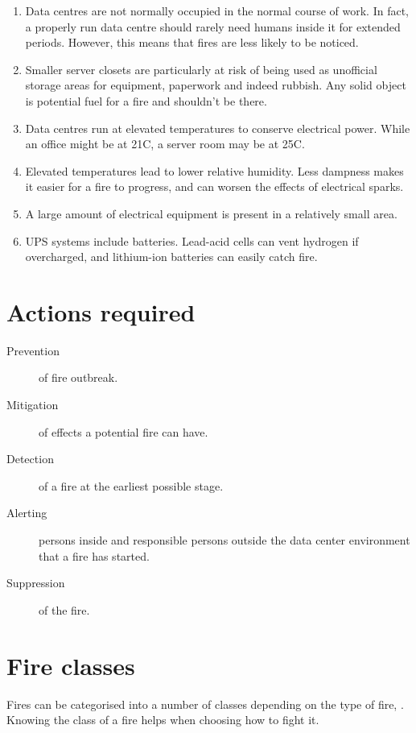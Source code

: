 \documentclass{pgnotes}
\begin{document}
\begin{enumerate}
\item
  Data centres are not normally occupied in the normal course of work.
  In fact, a properly run data centre should rarely need humans inside
  it for extended periods. However, this means that fires are less
  likely to be noticed.
\item
  Smaller server closets are particularly at risk of being used as
  unofficial storage areas for equipment, paperwork and indeed rubbish.
  Any solid object is potential fuel for a fire and shouldn't be there.
\item
  Data centres run at elevated temperatures to conserve electrical
  power. While an office might be at 21C, a server room may be at 25C.
\item
  Elevated temperatures lead to lower relative humidity. Less dampness
  makes it easier for a fire to progress, and can worsen the effects of
  electrical sparks.
\item
  A large amount of electrical equipment is present in a relatively
  small area.
\item
  UPS systems include batteries. Lead-acid cells can vent hydrogen if
  overcharged, and lithium-ion batteries can easily catch fire.
\end{enumerate}

\section{Actions required}
\label{sec:actions-required}

\begin{description}
\item[Prevention]
of fire outbreak.
\item[Mitigation]
of effects a potential fire can have.
\item[Detection]
of a fire at the earliest possible stage.
\item[Alerting]
persons inside and responsible persons outside the data center
environment that a fire has started.
\item[Suppression]
of the fire.
\end{description}

\section{Fire classes}
\label{sec:fire-classes}

Fires can be categorised into a number of classes depending on the type
of fire, . Knowing the class of a fire helps when choosing how to fight
it.
\end{document}
